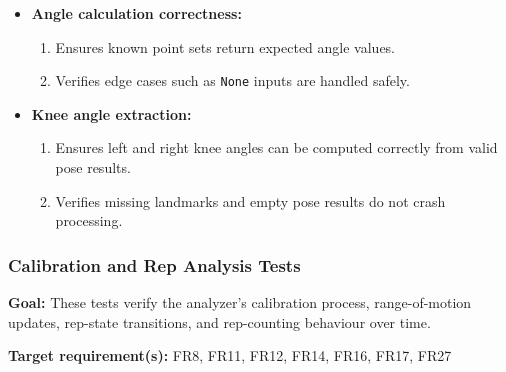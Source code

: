 \documentclass[12pt, titlepage]{article}
\begin{document}
\begin{itemize}
    \item \textbf{Angle calculation correctness:}
    \begin{enumerate}
        \item Ensures known point sets return expected angle values.
        \item Verifies edge cases such as \texttt{None} inputs are handled safely.
    \end{enumerate}

    \item \textbf{Knee angle extraction:}
    \begin{enumerate}
        \item Ensures left and right knee angles can be computed correctly from valid pose results.
        \item Verifies missing landmarks and empty pose results do not crash processing.
    \end{enumerate}
\end{itemize}


\subsubsection{Calibration and Rep Analysis Tests}

\textbf{Goal:} These tests verify the analyzer’s calibration process, range-of-motion updates, rep-state transitions, and rep-counting behaviour over time.

\textbf{Target requirement(s):} FR8, FR11, FR12, FR14, FR16, FR17, FR27
\end{document}
